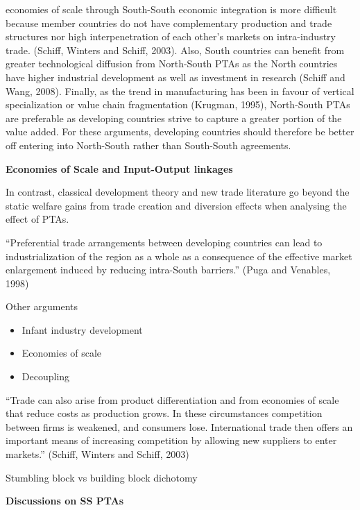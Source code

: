 economies of scale through South-South economic integration is more
difficult because member countries do not have complementary production
and trade structures nor high interpenetration of each other's markets
on intra-industry trade. (Schiff, Winters and Schiff, 2003). Also, South
countries can benefit from greater technological diffusion from
North-South PTAs as the North countries have higher industrial
development as well as investment in research (Schiff and Wang, 2008).
Finally, as the trend in manufacturing has been in favour of vertical
specialization or value chain fragmentation (Krugman, 1995), North-South
PTAs are preferable as developing countries strive to capture a greater
portion of the value added. For these arguments, developing countries
should therefore be better off entering into North-South rather than
South-South agreements.

\textbf{Economies of Scale and Input-Output linkages}

In contrast, classical development theory and new trade literature go
beyond the static welfare gains from trade creation and diversion
effects when analysing the effect of PTAs.

``Preferential trade arrangements between developing countries can lead
to industrialization of the region as a whole as a consequence of the
effective market enlargement induced by reducing intra-South barriers.''
(Puga and Venables, 1998)

Other arguments

\begin{itemize}
\item
  Infant industry development
\item
  Economies of scale
\item
  Decoupling
\end{itemize}

``Trade can also arise from product differentiation and from economies
of scale that reduce costs as production grows. In these circumstances
competition between firms is weakened, and consumers lose. International
trade then offers an important means of increasing competition by
allowing new suppliers to enter markets.'' (Schiff, Winters and Schiff,
2003)

Stumbling block vs building block dichotomy

\textbf{Discussions on SS PTAs}

